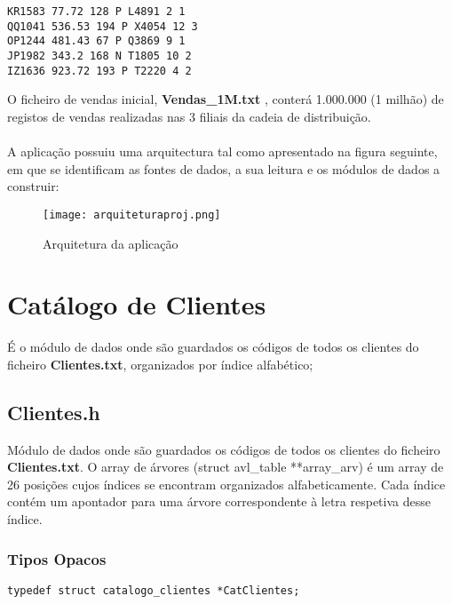  \begin{Verbatim}
KR1583 77.72 128 P L4891 2 1
QQ1041 536.53 194 P X4054 12 3
OP1244 481.43 67 P Q3869 9 1
JP1982 343.2 168 N T1805 10 2
IZ1636 923.72 193 P T2220 4 2 
 \end{Verbatim}
 
 
O ficheiro de vendas inicial, \textbf{Vendas\_1M.txt} , conterá 1.000.000 (1 milhão) de registos de vendas realizadas nas 3 filiais da cadeia de distribuição. 

\newpage 
\paragraph{}
A aplicação possuiu uma arquitectura tal como apresentado na figura seguinte, em que se identificam as fontes de dados, a sua leitura e os módulos de dados a construir: 



\begin{figure}[h!]
	\texttt{[image: arquiteturaproj.png]}  
	\caption{Arquitetura da aplicação}  
\end{figure}



\section{Catálogo de Clientes}
É o módulo de dados onde são guardados os códigos de todos os clientes do ficheiro \textbf{Clientes.txt}, organizados por índice alfabético; 

\subsection{Clientes.h}

Módulo de dados onde são guardados os códigos de todos os clientes do ficheiro \textbf{Clientes.txt}. O array de árvores (struct avl\_table **array\_arv) é um array de 26 posições cujos índices se encontram organizados alfabeticamente. Cada índice contém um apontador para uma árvore correspondente à letra respetiva desse índice.

\subsubsection{Tipos Opacos}

\begin{Verbatim}
typedef struct catalogo_clientes *CatClientes;
\end{Verbatim}

